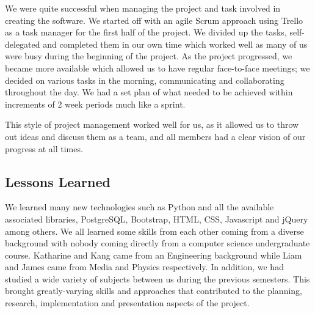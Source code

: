 \documentclass[11pt]{article}
\begin{document}
We were quite successful when managing the project and task involved in creating the software. We started off with an agile Scrum approach using Trello as a task manager for the first half of the project. We divided up the tasks, self-delegated and completed them in our own time which worked well as many of us were busy during the beginning of the project. As the project progressed, we became more available which allowed us to have regular face-to-face meetings; we decided on various tasks in the morning, communicating and collaborating throughout the day. We had a set plan of what needed to be achieved within increments of 2 week periods much like a sprint.

This style of project management worked well for us, as it allowed us to throw out ideas and discuss them as a team, and all members had a clear vision of our progress at all times.

\subsection{Lessons Learned}
We learned many new technologies such as Python and all the available associated libraries, PostgreSQL, Bootstrap, HTML, CSS, Javascript and jQuery among others. We all learned some skills from each other coming from a diverse background with nobody coming directly from a computer science undergraduate course. Katharine and Kang came from an Engineering background while Liam and James came from Media and Physics respectively. In addition, we had studied a wide variety of subjects between us during the previous semesters. This brought greatly-varying skills and approaches that contributed to the planning, research, implementation and presentation aspects of the project.



\end{document}
